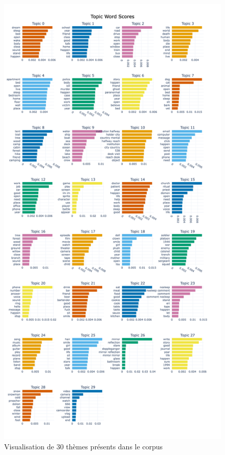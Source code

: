 \documentclass[a4paper,12pt,onecolumn,oneside]{article}
\begin{document}
\begin{figure}[htbp]
\centering
    \includegraphics[scale=0.2]{bertopic_topic.png}
    \caption{Visualisation de 30 thèmes présents dans le corpus}
\end{figure}
\\
\end{document}
